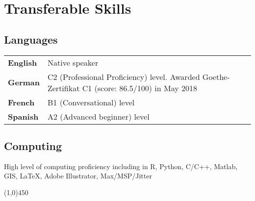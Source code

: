 \section*{Transferable Skills}

\subsection*{Languages}

\begin{center}
\begin{tabular}{ l l }
\textbf{English}  & Native speaker\\ 
\textbf{German} & C2 (Professional Proficiency) level. Awarded Goethe-Zertifikat C1 (score: 86.5/100) in May 2018\\ 
\textbf{French}  & B1 (Conversational) level\\ 
\textbf{Spanish}  & A2 (Advanced beginner) level\\ 
\end{tabular}
\end{center}

\subsection*{Computing}

\noindent High level of computing proficiency including in R, Python, C/C++, Matlab, GIS, \LaTeX, Adobe Illustrator, Max/MSP/Jitter



\begin{center} \line(1,0){450} \end{center}